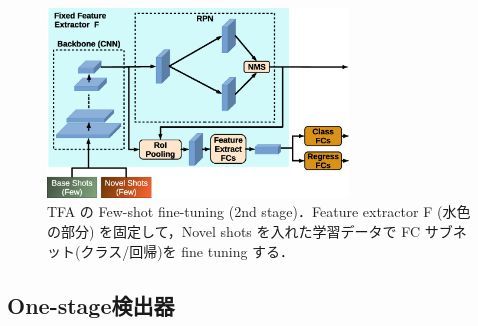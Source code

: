 \documentclass[twocolumn]{jsarticle} %
\begin{document}
\begin{figure}[tb]
    \begin{center}
        \includegraphics[width=8cm,clip]{fig/archi_TFA.eps}
    \end{center}
    \caption{ TFA の Few-shot fine-tuning (2nd stage)．Feature extractor F (水色の部分) を固定して，Novel shots を入れた学習データで FC サブネット(クラス/回帰)を fine tuning する．}
    \label{fig:archi_TFA}
\end{figure}

\subsection{One-stage検出器}
\end{document}
